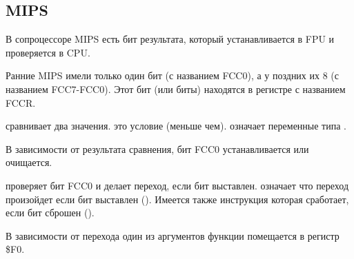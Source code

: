 \subsection{MIPS}


В сопроцессоре MIPS есть бит результата, который устанавливается в FPU и проверяется в CPU.

Ранние MIPS имели только один бит (с названием FCC0), а у поздних их 8 (с названием FCC7-FCC0).
Этот бит (или биты) находятся в регистре с названием FCCR.



 сравнивает два значения. 
 это условие  (меньше чем).
 означает переменные типа \Tdouble.

В зависимости от результата сравнения, бит FCC0 устанавливается или очищается.

 проверяет бит FCC0 и делает переход, если бит выставлен.
 означает что переход произойдет если бит выставлен ().
Имеется также инструкция  которая сработает, если бит сброшен ().

В зависимости от перехода один из аргументов функции помещается в регистр \$F0.

